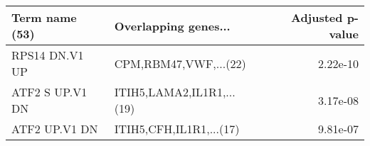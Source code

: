 \begin{tabular}{llr}
\toprule
 Term name (53) &      Overlapping genes... &  Adjusted p-value \\
\midrule
 RPS14 DN.V1 UP &     CPM,RBM47,VWF,...(22) &          2.22e-10 \\
ATF2 S UP.V1 DN & ITIH5,LAMA2,IL1R1,...(19) &          3.17e-08 \\
  ATF2 UP.V1 DN &   ITIH5,CFH,IL1R1,...(17) &          9.81e-07 \\
\bottomrule
\end{tabular}
